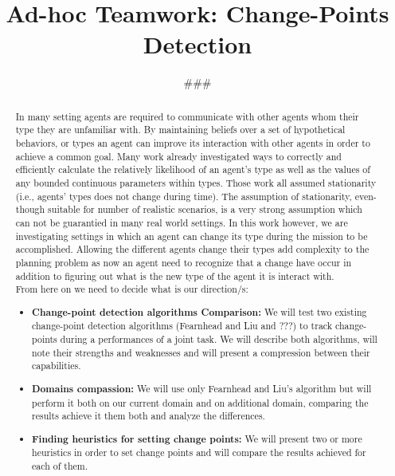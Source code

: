 \documentclass{article}
\begin{document}
\title{Ad-hoc Teamwork: Change-Points Detection}



\author{\#\#\#}



\maketitle

\begin{abstract} 

In many setting agents are required to communicate with other agents whom their type they are unfamiliar with. By maintaining beliefs over a set of hypothetical behaviors, or types an agent can improve its interaction with other agents in order to achieve a common goal. Many work already investigated ways to correctly and efficiently calculate the relatively likelihood of an agent's type as well as the values of any bounded continuous parameters within types. Those work all assumed stationarity (i.e., agents' types does not change during time). The assumption of stationarity, even-though suitable for number of realistic scenarios, is a very strong assumption which can not be guarantied in many real world settings. In this work however, we are investigating settings in which an agent can change its type during the mission to be accomplished. Allowing the different agents change their types add complexity to the planning problem as now an agent need to recognize that a change have occur in addition to figuring out what is the new type of the agent it is interact with.\\
From here on we need to decide what is our direction/s:
\begin{itemize}
	\item \textbf{Change-point detection algorithms Comparison:} We will test two existing change-point detection algorithms (Fearnhead and Liu and ???) to track change-points during a performances of a joint task. We will describe both algorithms, will note their strengths and weaknesses and will present a compression between their capabilities.
	\item \textbf{Domains compassion:} We will use only Fearnhead and Liu's algorithm but will perform it both on our current domain and on additional domain, comparing the results achieve it them both and analyze the differences.
	\item \textbf{Finding heuristics for setting change points:} We will present two or more heuristics in order to set change points and will compare the results achieved for each of them.
	\end{itemize}
\end{abstract}
\end{document}
